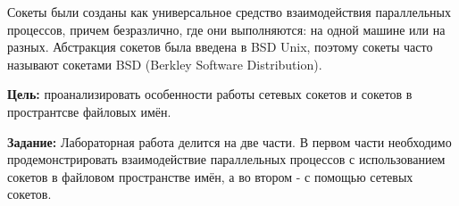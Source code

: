 \Introduction

Сокеты были созданы как универсальное средство взаимодействия параллельных процессов, причем безразлично, где они выполняются: на одной машине или на разных. Абстракция сокетов была введена в BSD Unix, поэтому сокеты часто называют сокетами BSD (Berkley Software Distribution).

\textbf{Цель:} проанализировать особенности работы сетевых сокетов и сокетов в пространтсве файловых имён.

\textbf{Задание:}
Лабораторная работа делится на две части.
В первом части необходимо продемонстрировать взаимодействие параллельных процессов с использованием сокетов в файловом пространстве имён, а во втором - с помощью сетевых сокетов.
